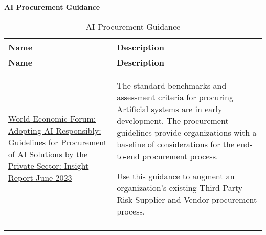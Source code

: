 \clearpage
\textbf{AI Procurement Guidance}
\setlength\LTleft{0pt}
\setlength\LTright{0pt}
\begin{longtable}[c]{|p{}|p{}|}
  \hline
  \rowcolor{owasplightpurple}
  \textbf{Name} &
  \textbf{Description} \\
  \hline
  \endfirsthead
  \hline
  \rowcolor{owasplightpurple}
  \textbf{Name} &
  \textbf{Description} \\
  \hline
  \endhead
  \endfoot
  \href{https://www3.weforum.org/docs/WEF_Adopting_AI_Responsibly_Guidelines_for_Procurement_of_AI_Solutions_by_the_Private_Sector_2023.pdf}{World Economic Forum: Adopting AI Responsibly: Guidelines for Procurement of AI Solutions by the Private Sector: Insight Report June 2023} &
  The standard benchmarks and assessment criteria for procuring Artificial
  systems are in early development. The procurement guidelines provide
  organizations with a baseline of considerations for the end-to-end
  procurement process.

  Use this guidance to augment an organization's existing Third Party Risk
  Supplier and Vendor procurement process. \\
  \hline
  \caption{AI Procurement Guidance}
  \label{tab:ai-procurement-guidance}
\end{longtable}